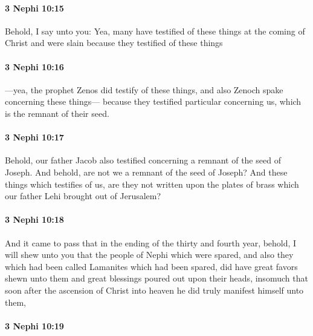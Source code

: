 		\paragraph{3 Nephi 10:15} %
			\label{3NEPHI-10-15}

			Behold, I say unto you:
			Yea, many have testified of these things at the coming of Christ
			and were slain because they testified of these things

		\paragraph{3 Nephi 10:16} %
			\label{3NEPHI-10-16}

			---yea, the prophet Zenos did testify of these things,
			and also Zenoch spake concerning these things---
			because they testified particular concerning us,
			which is the remnant of their seed.

		\paragraph{3 Nephi 10:17} %
			\label{3NEPHI-10-17}

			Behold, our father Jacob also testified concerning a remnant of the seed of Joseph.
			And behold, are not we a remnant of the seed of Joseph?
			And these things which testifies of us,
			are they not written upon the plates of brass
			which our father Lehi brought out of Jerusalem?

		\paragraph{3 Nephi 10:18} %
			\label{3NEPHI-10-18}

			And it came to pass that in the ending of the thirty and fourth year,
			behold, I will shew unto you that the people of Nephi which were spared,
			and also they which had been called Lamanites which had been spared,
			did have great favors shewn unto them
			and great blessings poured out upon their heads,
			insomuch that soon after the ascension of Christ into heaven
			he did truly manifest himself unto them,

		\paragraph{3 Nephi 10:19} %
			\label{3NEPHI-10-19}

